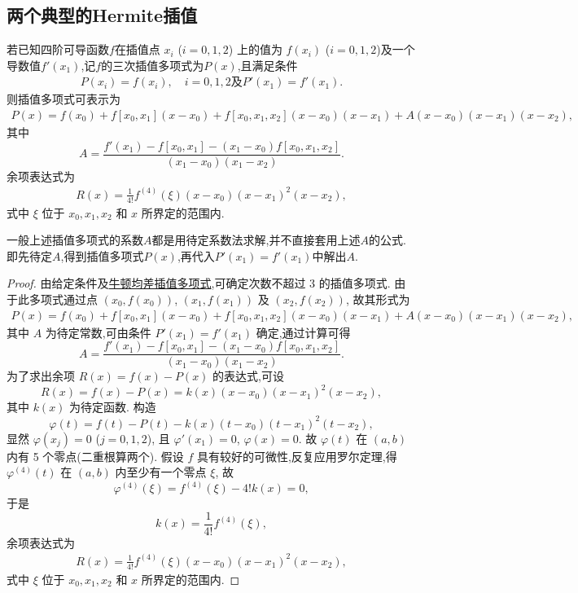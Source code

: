 \documentclass[../../main.tex]{subfiles}
\begin{document}
\subsection{两个典型的Hermite插值}

\begin{theorem}
若已知四阶可导函数$f$在插值点 $x_i$ ($i = 0, 1, 2$) 上的值为 $f(x_i)$ ($i = 0, 1, 2$)及一个导数值$f'(x_1)$,记$f$的三次插值多项式为$P(x)$,且满足条件
\begin{align*}
P(x_i) = f(x_i), \quad i = 0, 1,2\text{及}P'(x_1)=f'(x_1).
\end{align*}
则插值多项式可表示为
\begin{align*}
P(x) = f(x_0) + f[x_0, x_1](x - x_0) + f[x_0, x_1, x_2](x - x_0)(x - x_1) + A(x - x_0)(x - x_1)(x - x_2),
\end{align*}
其中\[
A = \frac{f'(x_1) - f[x_0, x_1] - (x_1 - x_0)f[x_0, x_1, x_2]}{(x_1 - x_0)(x_1 - x_2)}.
\]
余项表达式为
\begin{align}
R(x) = \frac{1}{4!}f^{(4)}(\xi)(x - x_0)(x - x_1)^2(x - x_2), \label{eq:数值分析-4.5}
\end{align}
式中 $\xi$ 位于 $x_0, x_1, x_2$ 和 $x$ 所界定的范围内.
\end{theorem}
\begin{remark}
一般上述插值多项式的系数$A$都是用待定系数法求解,并不直接套用上述$A$的公式.即先待定$A$,得到插值多项式$P(x)$,再代入$P'(x_1)=f'(x_1)$中解出$A$.
\end{remark}
\begin{proof}
由给定条件及\hyperref[theorem:牛顿均差插值多项式]{牛顿均差插值多项式},可确定次数不超过 3 的插值多项式. 由于此多项式通过点 $(x_0, f(x_0))$, $(x_1, f(x_1))$ 及 $(x_2, f(x_2))$, 故其形式为
\begin{align*}
P(x) = f(x_0) + f[x_0, x_1](x - x_0) + f[x_0, x_1, x_2](x - x_0)(x - x_1) + A(x - x_0)(x - x_1)(x - x_2),
\end{align*}
其中 $A$ 为待定常数,可由条件 $P'(x_1) = f'(x_1)$ 确定,通过计算可得
\[
A = \frac{f'(x_1) - f[x_0, x_1] - (x_1 - x_0)f[x_0, x_1, x_2]}{(x_1 - x_0)(x_1 - x_2)}.
\]
为了求出余项 $R(x) = f(x) - P(x)$ 的表达式,可设
\[
R(x) = f(x) - P(x) = k(x)(x - x_0)(x - x_1)^2(x - x_2),
\]
其中 $k(x)$ 为待定函数. 构造
\[
\varphi(t) = f(t) - P(t) - k(x)(t - x_0)(t - x_1)^2(t - x_2),
\]
显然 $\varphi(x_j) = 0$ ($j = 0, 1, 2$), 且 $\varphi'(x_1) = 0$, $\varphi(x) = 0$. 故 $\varphi(t)$ 在 $(a, b)$ 内有 5 个零点(二重根算两个). 假设 $f$ 具有较好的可微性,反复应用罗尔定理,得 $\varphi^{(4)}(t)$ 在 $(a, b)$ 内至少有一个零点 $\xi$, 故
\[
\varphi^{(4)}(\xi) = f^{(4)}(\xi) - 4!k(x) = 0,
\]
于是
\[
k(x) = \frac{1}{4!}f^{(4)}(\xi),
\]
余项表达式为
\begin{align*}
R(x) = \frac{1}{4!}f^{(4)}(\xi)(x - x_0)(x - x_1)^2(x - x_2),
\end{align*}
式中 $\xi$ 位于 $x_0, x_1, x_2$ 和 $x$ 所界定的范围内.
\end{proof}
\end{document}

